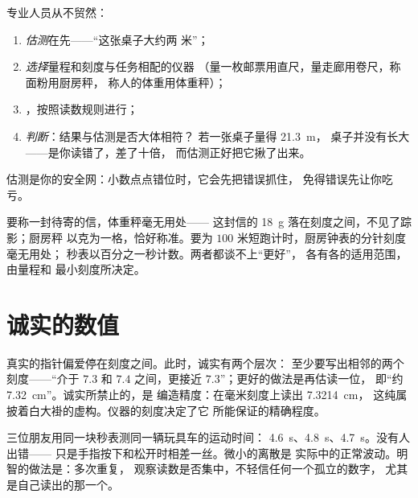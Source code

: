 \begin{method}[估测、测量、判断]\label{met:g6:measurement-in-science:estimate}
专业人员从不贸然：
\begin{enumerate}
  \item \emph{估测}在先——“这张桌子大约两
        米”；
  \item \emph{选择}量程和刻度与任务相配的仪器
        （量一枚邮票用直尺，量走廊用卷尺，称面粉用厨房秤，
        称人的体重用体重秤）；
  \item \emph{}，按照读数规则进行；
  \item \emph{判断}：结果与估测是否大体相符？
        若一张桌子量得 \qty{21.3}{m}，
        桌子并没有长大——是你读错了，差了十倍，
        而估测正好把它揪了出来。
\end{enumerate}
估测是你的安全网：小数点点错位时，它会先把错误抓住，
免得错误先让你吃亏。
\end{method}

\begin{example}[慎重选择]\label{ex:g6:measurement-in-science:choose}
要称一封待寄的信，体重秤毫无用处——
这封信的 \qty{18}{g} 落在刻度之间，不见了踪影；厨房秤
以克为一格，恰好称准。要为
$100$ 米短跑计时，厨房钟表的分针刻度毫无用处；
秒表以百分之一秒计数。两者都谈不上“更好”，
各有各的适用范围，由量程和
最小刻度所决定。
\end{example}

\section{诚实的数值}

\begin{remark}[刻度之间]\label{rem:g6:measurement-in-science:between}
真实的指针偏爱停在刻度之间。此时，诚实有两个层次：
至少要写出相邻的两个刻度——“介于 $7.3$ 和
$7.4$ 之间，更接近 $7.3$”；更好的做法是再估读一位，
即“约 \qty{7.32}{cm}”。诚实所禁止的，是
编造精度：在毫米刻度上读出 \qty{7.3214}{cm}，
这纯属披着白大褂的虚构。仪器的刻度决定了它
所能保证的精确程度。
\end{remark}

\begin{example}\label{ex:g6:measurement-in-science:repeat}
三位朋友用同一块秒表测同一辆玩具车的运动时间：
\qty{4.6}{s}、\qty{4.8}{s}、\qty{4.7}{s}。没有人出错——
只是手指按下和松开时相差一丝。微小的离散是
实际中的正常波动。明智的做法是：多次重复，
观察读数是否集中，不轻信任何一个孤立的数字，
尤其是自己读出的那一个。
\end{example}

